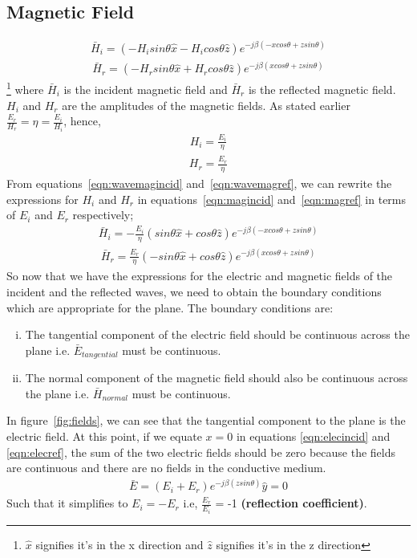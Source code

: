 \subsection{Magnetic Field}
\begin{align}
\bar{H}_i = (-H_i sin\theta \hat{x} - H_i cos\theta \hat{z}) e ^{-j\beta( -xcos\theta + zsin\theta)}
\label{eqn:magincid}
\end{align}
\begin{align}
\bar{H}_r = (-H_r sin\theta \hat{x} + H_r cos\theta \hat{z}) e ^{-j\beta( xcos\theta + zsin\theta)}
\label{eqn:magref}
\end{align}\footnote{$\hat{x}$ signifies it's in the x direction and $\hat{z}$ signifies it's in the z direction}
where $\bar{H}_i$ is the incident magnetic field and $\bar{H}_r$ is the reflected magnetic field. $H_i$ and $H_r$ are the amplitudes of the magnetic fields. As stated earlier $\frac{E_r}{H_r} = \eta = \frac{E_i}{H_i}$, hence, 
\begin{align}
H_i = \frac{E_i}{\eta}
\label{eqn:wavemagincid}
\end{align}
\begin{align}
H_r = \frac{E_r}{\eta}
\label{eqn:wavemagref}
\end{align}
From equations~\eqref{eqn:wavemagincid} and~\eqref{eqn:wavemagref}, we can rewrite the expressions for $H_i$ and $H_r$ in equations~\eqref{eqn:magincid} and~\eqref{eqn:magref} in terms of $E_i$ and $E_r$ respectively;
\begin{align}
\bar{H}_i = - \frac{E_i}{\eta} (sin\theta \hat{x} + cos\theta \hat{z})e^{-j\beta (-xcos\theta + zsin\theta)}
\end{align}
\begin{align}
\bar{H}_r =  \frac{E_r}{\eta} (-sin\theta \hat{x} + cos\theta \hat{z})e^{-j\beta (xcos\theta + zsin\theta)}
\end{align}
So now that we have the expressions for the electric and magnetic fields of the incident and the reflected waves, we need to obtain the boundary conditions which are appropriate for the plane.
The boundary conditions are:
\begin{enumerate}[(i)]
\item The tangential component of the electric field should be continuous across the plane i.e. $\bar{E}_{tangential}$ must be continuous.
\item The normal component of the magnetic field should also be continuous across the plane i.e. $\bar{H}_{normal}$ must be continuous.
\end{enumerate} 
In figure~\ref{fig:fields}, we can see that the tangential component to the plane is the electric field. At this point, if we equate $x = 0$ in equations \ref{eqn:elecincid} and \ref{eqn:elecref}, the sum of the two electric fields should be zero because the fields are continuous and there are no fields in the conductive medium.
\begin{align}
\bar{E} = (E_i + E_r) e^{-j\beta(zsin\theta) }\hat{y} = 0
\end{align}
Such that it simplifies to $E_i = - E_r$ i.e, $\frac{E_r}{E_i}$ = -1 \textbf{(reflection coefficient)}. 

